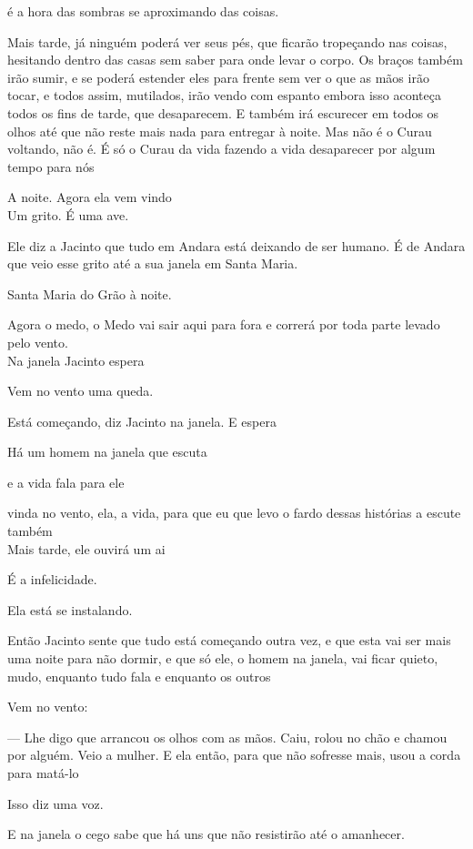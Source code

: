 é a hora das sombras se aproximando das coisas.

Mais tarde, já ninguém poderá ver seus pés, que ficarão tropeçando nas
coisas, hesitando dentro das casas sem saber para onde levar o corpo. Os
braços também irão sumir, e se poderá estender eles para frente sem ver
o que as mãos irão tocar, e todos assim, mutilados, irão vendo com
espanto embora isso aconteça todos os fins de tarde, que desaparecem. E
também irá escurecer em todos os olhos até que não reste mais nada para
entregar à noite. Mas não é o Curau voltando, não é. É só o Curau da
vida fazendo a vida desaparecer por algum tempo para nós

A noite. Agora ela vem vindo\\

Um grito. É uma ave.

Ele diz a Jacinto que tudo em Andara está deixando de ser humano. É de
Andara que veio esse grito até a sua janela em Santa Maria.

Santa Maria do Grão à noite.

Agora o medo, o Medo vai sair aqui para fora e correrá por toda parte
levado pelo vento.\\

Na janela Jacinto espera

Vem no vento uma queda.

Está começando, diz Jacinto na janela. E espera

Há um homem na janela que escuta

e a vida fala para ele

vinda no vento, ela, a vida, para que eu que levo o fardo dessas
histórias a escute também\\

Mais tarde, ele ouvirá um ai

É a infelicidade.

Ela está se instalando.

Então Jacinto sente que tudo está começando outra vez, e que esta vai
ser mais uma noite para não dormir, e que só ele, o homem na janela, vai
ficar quieto, mudo, enquanto tudo fala e enquanto os outros

Vem no vento:

--- Lhe digo que arrancou os olhos com as mãos. Caiu, rolou no chão e
chamou por alguém. Veio a mulher. E ela então, para que não sofresse
mais, usou a corda para matá-lo

Isso diz uma voz.

E na janela o cego sabe que há uns que não resistirão até o amanhecer.


